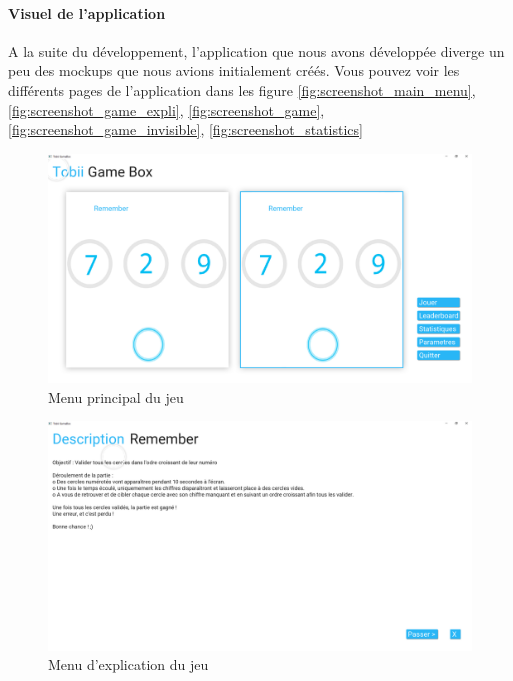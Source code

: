 \documentclass{polytech/polytech}
\begin{document}
\paragraph{Visuel de l'application}
A la suite du développement, l'application que nous avons développée diverge un peu des mockups que nous avions initialement créés. Vous pouvez voir les différents pages de l'application dans les figure \autoref{fig:screenshot_main_menu}, \autoref{fig:screenshot_game_expli}, \autoref{fig:screenshot_game}, \autoref{fig:screenshot_game_invisible}, \autoref{fig:screenshot_statistics}

\begin{figure}
    \centering
    \includegraphics[width=15cm]{img/screenshots/menu_principal.PNG}
    \caption{Menu principal du jeu}
    \label{fig:screenshot_main_menu}
\end{figure}

\begin{figure}
    \centering
    \includegraphics[width=15cm]{img/screenshots/jeu_explication.PNG}
    \caption{Menu d'explication du jeu}
    \label{fig:screenshot_game_expli}
\end{figure}
\end{document}
